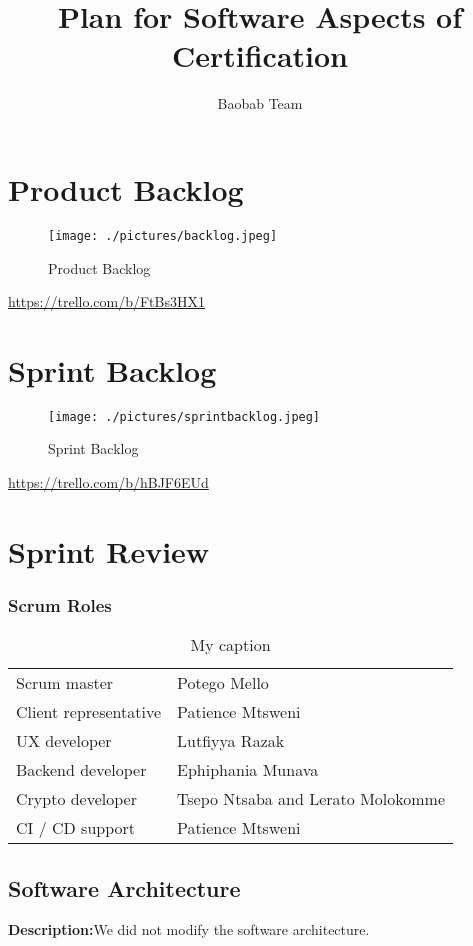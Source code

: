 \documentclass[a4paper]{article}
\title{Plan for Software Aspects of Certification}
\author{Baobab Team}
\begin{document}
\newpage


\newpage

\section{Product Backlog}
\begin{figure}[H]
\texttt{[image: ./pictures/backlog.jpeg]}\\
\caption{\label{fig:Product Backlog}Product Backlog}
\end{figure}

\hyperref[Product Backlog on Trello]{https://trello.com/b/FtBs3HX1}
\newpage

\section{Sprint Backlog}
\begin{figure}[H]
\texttt{[image: ./pictures/sprintbacklog.jpeg]}\\
\caption{\label{fig:Sprint Backlog}Sprint Backlog}
\end{figure}
\hyperref[Sprint Backlog on Trello]{https://trello.com/b/hBJF6EUd}


\newpage

\section{Sprint Review}

\subsubsection{Scrum Roles}
\begin{table}[h]
\centering
\caption{My caption}
\label{User Roles}
\begin{tabular}{ll}
Scrum master & Potego Mello\\
Client representative & Patience Mtsweni\\
UX developer & Lutfiyya Razak\\
Backend developer & Ephiphania Munava\\
Crypto developer & Tsepo Ntsaba and Lerato Molokomme\\
CI / CD support & Patience Mtsweni
\end{tabular}
\end{table}

\subsection{Software Architecture}
\textbf{Description:}We did not modify the software architecture. \\
\end{document}
